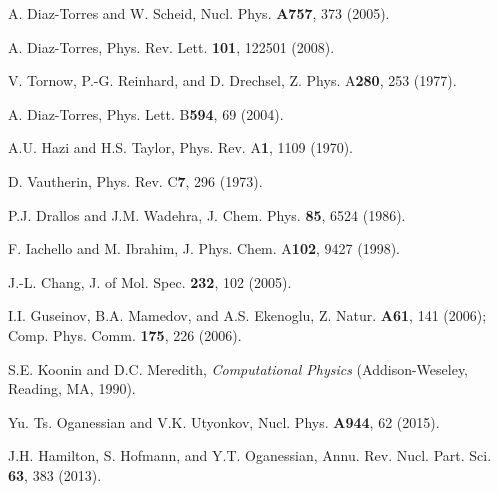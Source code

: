 \documentclass[superscriptaddress,twocolumn,amsmath,amssymb]{revtex4}
\begin{document}
\begin{thebibliography}{99}
A. Diaz-Torres and W. Scheid, Nucl. Phys. {\bf A757}, 373 (2005). 

A. Diaz-Torres, Phys. Rev. Lett. {\bf 101}, 122501 (2008). 

V. Tornow, P.-G. Reinhard, and D. Drechsel, 
Z. Phys. A{\bf 280}, 253 (1977). 

A. Diaz-Torres, Phys. Lett. B{\bf 594}, 69 (2004). 

A.U. Hazi and H.S. Taylor, 
Phys. Rev. A{\bf 1}, 1109 (1970). 

D. Vautherin, Phys. Rev. C{\bf 7}, 296 (1973). 

P.J. Drallos and J.M. Wadehra, J. Chem. Phys. {\bf 85}, 6524 (1986). 

F. Iachello and M. Ibrahim, J. Phys. Chem. A{\bf 102}, 9427 (1998). 

J.-L. Chang, J. of Mol. Spec. {\bf 232}, 102 (2005). 

I.I. Guseinov, B.A. Mamedov, and A.S. Ekenoglu, 
Z. Natur. {\bf A61}, 141 (2006); Comp. Phys. Comm. {\bf 175}, 226 (2006). 

S.E. Koonin and D.C. Meredith, {\it Computational Physics} 
(Addison-Weseley, Reading, MA, 1990). 

Yu. Ts. Oganessian and V.K. Utyonkov, 
Nucl. Phys. {\bf A944}, 62 (2015). 

J.H. Hamilton, S. Hofmann, and Y.T. Oganessian, 
Annu. Rev. Nucl. Part. Sci. {\bf 63}, 383 (2013). 

\end{thebibliography}
\end{document}
